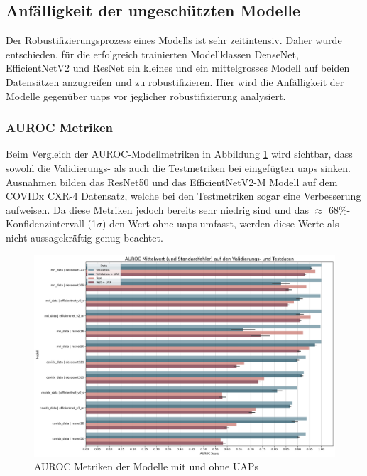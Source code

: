 \subsection{Anfälligkeit der ungeschützten Modelle}
Der Robustifizierungsprozess eines Modells ist sehr zeitintensiv. Daher wurde entschieden, für die erfolgreich trainierten Modellklassen DenseNet, EfficientNetV2 und ResNet ein kleines und ein mittelgrosses Modell auf beiden Datensätzen anzugreifen und zu robustifizieren. Hier wird die Anfälligkeit der Modelle gegenüber \acrshort{uap}s vor jeglicher \Gls{robustifizierung} analysiert.

\subsubsection{AUROC Metriken}
Beim Vergleich der AUROC-Modellmetriken in Abbildung \ref{fig:auroc-uap} wird sichtbar, dass sowohl die Validierungs- als auch die Testmetriken bei eingefügten \acrshort{uap}s sinken. Ausnahmen bilden das ResNet50 und das EfficientNetV2-M Modell auf dem COVIDx CXR-4 Datensatz, welche bei den Testmetriken sogar eine Verbesserung aufweisen. Da diese Metriken jedoch bereits sehr niedrig sind und das $\approx$ 68\%-Konfidenzintervall (1$\sigma$) den Wert ohne \acrshort{uap}s umfasst, werden diese Werte als nicht aussagekräftig genug beachtet.

\begin{figure}[H]
    \centering
    \includegraphics[width=\linewidth]{01-images/05-resultate/AUROCScores_UAP.png}
    \caption{AUROC Metriken der Modelle mit und ohne UAPs}
    \label{fig:auroc-uap}
\end{figure}

\newpage

